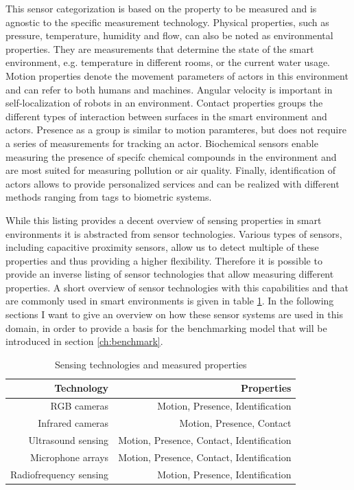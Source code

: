 This sensor categorization is based on the property to be measured and is agnostic to the specific measurement technology. Physical properties, such as pressure, temperature, humidity and flow, can also be noted as environmental properties. They are measurements that determine the state of the smart environment, e.g. temperature in different rooms, or the current water usage. Motion properties denote the movement parameters of actors in this environment and can refer to both humans and machines. Angular velocity is important in self-localization of robots in an environment. Contact properties groups the different types of interaction between surfaces in the smart environment and actors. Presence as a group is similar to motion paramteres, but does not require a series of measurements for tracking an actor. Biochemical sensors enable measuring the presence of specifc chemical compounds in the environment and are most suited for measuring pollution or air quality. Finally, identification of actors allows to provide personalized services and can be realized with different methods ranging from tags to biometric systems.

While this listing provides a decent overview of sensing properties in smart environments it is abstracted from sensor technologies. Various types of sensors, including capacitive proximity sensors, allow us to detect multiple of these properties and thus providing a higher flexibility. Therefore it is possible to provide an inverse listing of sensor technologies that allow measuring different properties. A short overview of sensor technologies with this capabilities and that are commonly used in smart environments is given in table \ref{tab:sen_tech_prop}. In the following sections I want to give an overview on how these sensor systems are used in this domain, in order to provide a basis for the benchmarking model that will be introduced in section \ref{ch:benchmark}.
\begin{table}[htbp]
  \centering
  \caption{Sensing technologies and measured properties}
    \begin{tabular}{rr}
    \toprule
    \textbf{Technology} & \textbf{Properties} \\
    \midrule
    RGB cameras  & Motion, Presence, Identification \\ \addlinespace
    Infrared cameras & Motion, Presence, Contact \\ \addlinespace
    Ultrasound sensing & Motion, Presence, Contact, Identification \\ \addlinespace
    Microphone arrays & Motion, Presence, Contact, Identification \\ \addlinespace
    Radiofrequency sensing & Motion, Presence, Identification \\
    \bottomrule
    \end{tabular}%
  \label{tab:sen_tech_prop}%
\end{table}%

